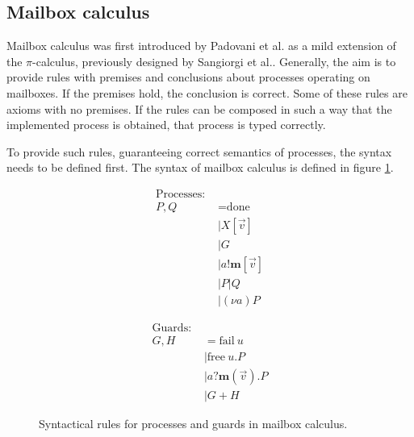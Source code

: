 
\subsection{Mailbox calculus}


Mailbox calculus was first introduced by Padovani et al.\cite{padovaniTypeCheckingAlgorithm2018} as a mild extension of the $\pi$-calculus, previously designed by Sangiorgi et al.\cite{sangiorgiPiCalculusTheoryMobile2003}. Generally, the aim is to provide rules with premises and conclusions about processes operating on mailboxes. If the premises hold, the conclusion is correct. Some of these rules are axioms with no premises. If the rules can be composed in such a way that the implemented process is obtained, that process is typed correctly.

To provide such rules, guaranteeing correct semantics of processes, the syntax needs to be defined first. The syntax of mailbox calculus is defined in figure \ref{fig:mailboxCalcSyntax}.

\begin{figure}[ht]
    \begin{minipage}[c]{0.5\textwidth}
        \begin{align*}
    \text{Processes: } \\
    P, Q &= \text{done} \tag{termination}\\
    &\mid X[\vec{v}] \tag{invocation}\\
    &\mid G \tag{guarded process}\\
    &\mid a!\textbf{m}[\vec{v}] \tag{stored message}\\
    &\mid P | Q \tag{parallel composition}\\
    &\mid (\nu a) P \tag{mailbox restriction}
        \end{align*}
    \end{minipage}
    \hfill
    \begin{minipage}[c]{0.5\textwidth}
        \begin{align*}
    \text{Guards: } \\
    G, H &= \text{fail}\ u \tag{runtime error}\\
    &\mid \text{free}\ u.P \tag{mailbox deletion}\\
    &\mid a?\textbf{m}(\vec{v}).P \tag{selective receive}\\
    &\mid G + H \tag{guard composition}
        \end{align*}
        \vfill
    \end{minipage}
\caption{Syntactical rules for processes and guards in mailbox calculus\cite{deliguoroMailboxTypesUnordered2018}.}
\label{fig:mailboxCalcSyntax}
\end{figure}

